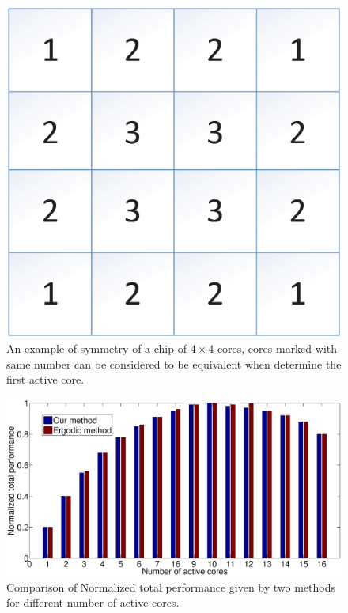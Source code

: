 \begin{figure}
\centering
\includegraphics[width=0.7\columnwidth]{fig/symmetry.eps}
\caption{An example of symmetry of a chip of $4 \times 4$ cores, cores marked with same number can be considered to be equivalent
when determine the first active core.
}
\label{fig:symmetry}
\end{figure}

\begin{figure}
\centering
\includegraphics[width=0.9\columnwidth]{fig/performance_compare.eps}
\caption{Comparison of Normalized total performance given by two methods for different number of active cores.}
\label{fig:performance_compare}
\end{figure}

